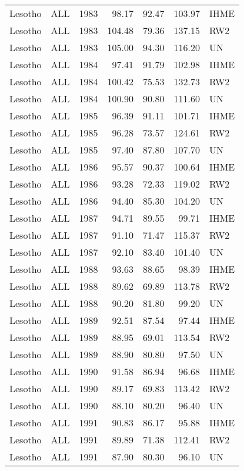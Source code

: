 \begin{longtable}{lllrrrl}
  Lesotho & ALL & 1983 & 98.17 & 92.47 & 103.97 & IHME \\ 
  Lesotho & ALL & 1983 & 104.48 & 79.36 & 137.15 & RW2 \\ 
  Lesotho & ALL & 1983 & 105.00 & 94.30 & 116.20 & UN \\ 
  Lesotho & ALL & 1984 & 97.41 & 91.79 & 102.98 & IHME \\ 
  Lesotho & ALL & 1984 & 100.42 & 75.53 & 132.73 & RW2 \\ 
  Lesotho & ALL & 1984 & 100.90 & 90.80 & 111.60 & UN \\ 
  Lesotho & ALL & 1985 & 96.39 & 91.11 & 101.71 & IHME \\ 
  Lesotho & ALL & 1985 & 96.28 & 73.57 & 124.61 & RW2 \\ 
  Lesotho & ALL & 1985 & 97.40 & 87.80 & 107.70 & UN \\ 
  Lesotho & ALL & 1986 & 95.57 & 90.37 & 100.64 & IHME \\ 
  Lesotho & ALL & 1986 & 93.28 & 72.33 & 119.02 & RW2 \\ 
  Lesotho & ALL & 1986 & 94.40 & 85.30 & 104.20 & UN \\ 
  Lesotho & ALL & 1987 & 94.71 & 89.55 & 99.71 & IHME \\ 
  Lesotho & ALL & 1987 & 91.10 & 71.47 & 115.37 & RW2 \\ 
  Lesotho & ALL & 1987 & 92.10 & 83.40 & 101.40 & UN \\ 
  Lesotho & ALL & 1988 & 93.63 & 88.65 & 98.39 & IHME \\ 
  Lesotho & ALL & 1988 & 89.62 & 69.89 & 113.78 & RW2 \\ 
  Lesotho & ALL & 1988 & 90.20 & 81.80 & 99.20 & UN \\ 
  Lesotho & ALL & 1989 & 92.51 & 87.54 & 97.44 & IHME \\ 
  Lesotho & ALL & 1989 & 88.95 & 69.01 & 113.54 & RW2 \\ 
  Lesotho & ALL & 1989 & 88.90 & 80.80 & 97.50 & UN \\ 
  Lesotho & ALL & 1990 & 91.58 & 86.94 & 96.68 & IHME \\ 
  Lesotho & ALL & 1990 & 89.17 & 69.83 & 113.42 & RW2 \\ 
  Lesotho & ALL & 1990 & 88.10 & 80.20 & 96.40 & UN \\ 
  Lesotho & ALL & 1991 & 90.83 & 86.17 & 95.88 & IHME \\ 
  Lesotho & ALL & 1991 & 89.89 & 71.38 & 112.41 & RW2 \\ 
  Lesotho & ALL & 1991 & 87.90 & 80.30 & 96.10 & UN \\ 

\end{longtable}

